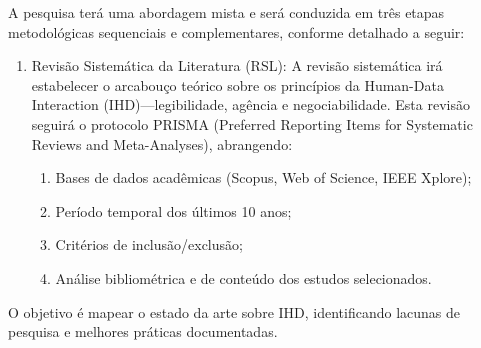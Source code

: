 \documentclass[
	12pt,				%
	oneside,			%
	a4paper,			%
	english,			%
	brazil				%
	]{abntex2ppgsi}
\begin{document}
     A pesquisa terá uma abordagem mista e será conduzida em três etapas metodológicas sequenciais e complementares, conforme detalhado a seguir:
    
        \begin{enumerate}
             \item Revisão Sistemática da Literatura (RSL):
             A revisão sistemática irá estabelecer o arcabouço teórico sobre os princípios da Human-Data Interaction (IHD)---legibilidade, agência e negociabilidade. Esta revisão seguirá o protocolo PRISMA (Preferred Reporting Items for Systematic Reviews and Meta-Analyses), abrangendo:
                 \begin{enumerate}
                   \item Bases de dados acadêmicas (Scopus, Web of Science, IEEE Xplore);
                   \item Período temporal dos últimos 10 anos;  
                   \item Critérios de inclusão/exclusão;
                   \item Análise bibliométrica e de conteúdo dos estudos selecionados.
                 \end{enumerate}
        \end{enumerate}         
            O objetivo é mapear o estado da arte sobre IHD, identificando lacunas de pesquisa e melhores práticas documentadas.
\end{document}
